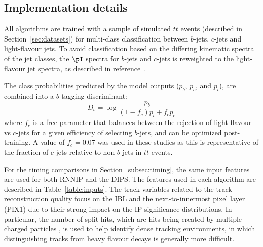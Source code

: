 \subsection{Implementation details} 
\label{subsec:algdetails}

All algorithms are trained with a sample of simulated $t\bar{t}$ events (described in Section~\ref{sec:datasets}) for multi-class classification between $b$-jets, $c$-jets and light-flavour jets. To avoid classification based on the differing kinematic spectra of the jet classes, the $\pT$ spectra for $b$-jets and $c$-jets is reweighted to the light-flavour jet spectra, as described in reference~\cite{ATL-PHYS-PUB-2017-003}.

The class probabilities predicted by the model outputs ($p_b$, $p_c$, and $p_l$), are combined into a $b$-tagging discriminant:
\begin{equation}
 D_b = \log \frac{p_b}{(1-f_c) p_l + f_c p_c}
 \label{eq:dipsdiscriminant}
\end{equation}
where $f_c$ is a free parameter that balances between the rejection of light-flavour vs $c$-jets for a given efficiency of selecting $b$-jets, and can be optimized post-training. 
A value of $f_c = 0.07$ was used in these studies  as this is representative of the fraction of $c$-jets relative to non $b$-jets in $t\bar{t}$ events. 

For the timing comparisons in Section~\ref{subsec:timing}, the same input features are used for both RNNIP and the DIPS. 
The features used in each algorithm are described in Table~\ref{table:inputs}.
The track variables related to the track reconstruction quality focus on the IBL and the next-to-innermost pixel layer (PIX1) due to their strong impact on the IP significance distributions. 
In particular, the number of split hits, which are hits being created by multiple charged particles \cite{PERF-2012-05}, is used to help identify dense tracking environments, in which distinguishing tracks from  heavy flavour decays is generally  more difficult. 


